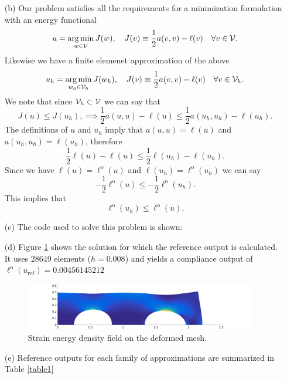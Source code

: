 \documentclass{article}
\begin{document}
\begin{itemize}
	\item[(b)] Our problem satisfies all the requirements for a minimization formulation with an energy functional 
	\begin{equation*}
		u = \operatorname*{arg\,min}\limits_{w\in\mathcal{V}} J(w), \quad J(v) \equiv \dfrac{1}{2}a(v,v) - \ell(v) \quad \forall v \in \mathcal{V}.
	\end{equation*}
	Likewise we have a finite elemenet approximation of the above
	\begin{equation*}
		u_h = \operatorname*{arg\,min}\limits_{w_h\in\mathcal{V}_h} J(w_h), \quad J(v) \equiv \dfrac{1}{2}a(v,v) - \ell(v) \quad \forall v \in \mathcal{V}_h.
	\end{equation*}
	We note that since \(\mathcal{V}_h \subset \mathcal{V} \) we can say that
	\begin{equation*}
		J(u) \leq J(u_h), \implies \dfrac{1}{2}a(u,u) - \ell(u) \leq \dfrac{1}{2}a(u_h,u_h) - \ell(u_h).
	\end{equation*}
	The definitions of \(u\) and \(u_h\) imply that \(a(u,u) = \ell(u) \) and  \(a(u_h,u_h) = \ell(u_h) \), therefore
	\begin{equation*}
		\dfrac{1}{2}\ell(u) - \ell(u) \leq \dfrac{1}{2}\ell(u_h) - \ell(u_h).
	\end{equation*}
	Since we have \(\ell(u) = \ell^\text{o}(u) \) and \(\ell(u_h) = \ell^\text{o}(u_h) \) we can say
	\begin{equation*}
		-\dfrac{1}{2}\ell^\text{o}(u) \leq -\dfrac{1}{2}\ell^\text{o}(u_h).
	\end{equation*}
	This implies that 
	\begin{equation*}
		\ell^\text{o}(u_h) \leq \ell^\text{o}(u).
	\end{equation*}
	\item[(c)] The code used to solve this problem is shown:
	
	\item[(d)] Figure \ref{refsoln} shows the solution for which the reference output is calculated. It uses 28649 elements (\(h = 0.008 \)) and yields a compliance output of \(\ell^\text{o}(u_\text{ref}) = 0.00456145212 \)
	\begin{figure}[H]
		\centering
		\includegraphics[width=0.95\textwidth]{test.pdf}
		\caption{Strain energy density field on the deformed mesh.}
		\label{refsoln}
	\end{figure}
	\item[(e)] Reference outputs for each family of approximations are summarized in Table \ref{table1}
			   

\end{itemize}
\end{document}
